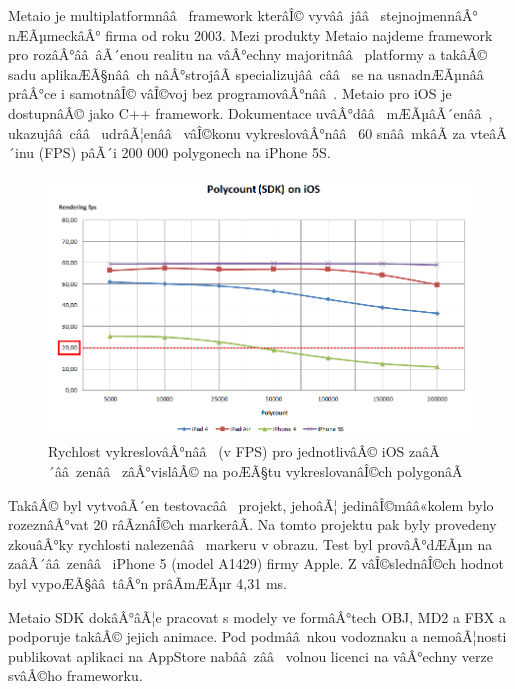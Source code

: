 \documentclass[twoside,12pt]{article}
\begin{document}
Metaio je multiplatformnââ  framework kterâÎ© vyvââ jââ  stejnojmennâÂ° nÆÃµmeckâÂ° firma od roku 2003. Mezi produkty Metaio najdeme framework pro rozâÂ°ââ âÃ´enou realitu na vâÂ°echny majoritnââ  platformy a takâÂ© sadu aplikaÆÃ§nââ ch nâÂ°strojâÃ specializujââ cââ  se na usnadnÆÃµnââ  prâÂ°ce i samotnâÎ© vâÎ©voj bez programovâÂ°nââ . Metaio pro iOS je dostupnâÂ© jako C++ framework. 
Dokumentace uvâÂ°dââ  mÆÃµâÃ´enââ , ukazujââ cââ  udrâÃ¦enââ  vâÎ©konu vykreslovâÂ°nââ  60 snââ mkâÃ za vteâÃ´inu (FPS) pâÃ´i 200 000 polygonech na iPhone 5S.

\begin{figure}[H]
\centering
    \includegraphics[width=424px, center]{images/Polycount_SDK_iOS_20fps.png}
\captionsetup{justification=centering}
    \caption{Rychlost vykreslovâÂ°nââ  (v FPS) pro jednotlivâÂ© iOS zaâÃ´ââ zenââ  zâÂ°vislâÂ© na poÆÃ§tu vykreslovanâÎ©ch polygonâÃ}
    \label{metaio_benchmark}
\end{figure}

TakâÂ© byl vytvoâÃ´en testovacââ  projekt, jehoâÃ¦ jedinâÎ©mââ«kolem bylo rozeznâÂ°vat 20 râÃznâÎ©ch markerâÃ. Na tomto projektu pak byly provedeny zkouâÂ°ky rychlosti nalezenââ  markeru v obrazu. Test byl provâÂ°dÆÃµn na zaâÃ´ââ zenââ  iPhone 5 (model A1429) firmy Apple. Z vâÎ©slednâÎ©ch hodnot byl vypoÆÃ§ââ tâÂ°n prâÃmÆÃµr 4,31 ms. 


Metaio SDK dokâÂ°âÃ¦e pracovat s modely ve formâÂ°tech OBJ, MD2 a FBX a podporuje takâÂ© jejich animace. Pod podmââ nkou vodoznaku a nemoâÃ¦nosti publikovat aplikaci na AppStore nabââ zââ  volnou licenci na vâÂ°echny verze svâÂ©ho frameworku. 
\end{document}

